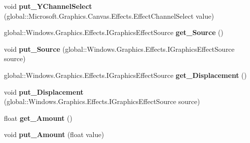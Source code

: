 \begin{DoxyCompactItemize}
void {\bfseries put\+\_\+\+Y\+Channel\+Select} (global\+::\+Microsoft.\+Graphics.\+Canvas.\+Effects.\+Effect\+Channel\+Select value)
\item 
\mbox{\label{interface_microsoft_1_1_graphics_1_1_canvas_1_1_effects_1_1_i_displacement_map_effect_a3ae94b5f7ba6e9a6577d1f8e64818dde}} 
global\+::\+Windows.\+Graphics.\+Effects.\+I\+Graphics\+Effect\+Source {\bfseries get\+\_\+\+Source} ()
\item 
\mbox{\label{interface_microsoft_1_1_graphics_1_1_canvas_1_1_effects_1_1_i_displacement_map_effect_a7510937c3744875c4cbbb6cb41254bd2}} 
void {\bfseries put\+\_\+\+Source} (global\+::\+Windows.\+Graphics.\+Effects.\+I\+Graphics\+Effect\+Source source)
\item 
\mbox{\label{interface_microsoft_1_1_graphics_1_1_canvas_1_1_effects_1_1_i_displacement_map_effect_ac59cc7dd5374f30d71b753983dba806d}} 
global\+::\+Windows.\+Graphics.\+Effects.\+I\+Graphics\+Effect\+Source {\bfseries get\+\_\+\+Displacement} ()
\item 
\mbox{\label{interface_microsoft_1_1_graphics_1_1_canvas_1_1_effects_1_1_i_displacement_map_effect_a2d5970972f40598f146c9ef349c15471}} 
void {\bfseries put\+\_\+\+Displacement} (global\+::\+Windows.\+Graphics.\+Effects.\+I\+Graphics\+Effect\+Source source)
\item 
\mbox{\label{interface_microsoft_1_1_graphics_1_1_canvas_1_1_effects_1_1_i_displacement_map_effect_a7aebbe3771b9e29fcf061b4a886e6364}} 
float {\bfseries get\+\_\+\+Amount} ()
\item 
\mbox{\label{interface_microsoft_1_1_graphics_1_1_canvas_1_1_effects_1_1_i_displacement_map_effect_a047ea38a52db6d5b2bc8f9a69edc8c1f}} 
void {\bfseries put\+\_\+\+Amount} (float value)
\item 

\end{DoxyCompactItemize}
